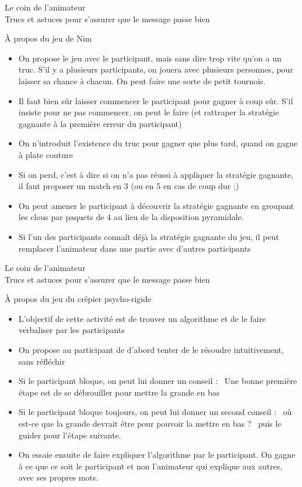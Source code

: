 \documentclass[final,hyperref={pdfpagelabels=false}]{beamer}
\renewcommand*{\large}{\fontsize{\resultlargeX}{\resultlargeY}\selectfont}
\begin{document}
\begin{frame}{Le coin de l'animateur\\[-5pt]
\label{coin::animateur}
  {\large Trucs et astuces pour s'assurer que le message passe bien}}
\begin{block}{À propos du jeu de Nim}
\begin{itemize}
    \item On propose le jeu avec le participant, mais sans dire trop vite qu'on
      a un truc. S'il y a plusieurs participants, on jouera avec plusieurs
      personnes, pour laisser sa chance à chacun. On peut faire une sorte de
      petit tournois.
    \item Il faut bien sûr laisser commencer le participant pour gagner à coup
      sûr. S'il insiste pour ne pas commencer, on peut le faire (et rattraper
      la stratégie gagnante à la première erreur du participant)
    \item On n'introduit l'existence du truc pour gagner que plus tard, quand
      on gagne à plate couture
    \item Si on perd, c'est à dire si on n'a pas réussi à appliquer la
      stratégie gagnante, il faut proposer un match en 3 (ou en 5 en cas de
      coup dur ;)
    \item On peut amener le participant à découvrir la stratégie gagnante en
      groupant les clous par paquets de 4 au lieu de la disposition pyramidale.
    \item Si l'un des participants connaît déjà la stratégie gagnante du jeu,
      il peut remplacer l'animateur dans une partie avec d'autres participants
    \end{itemize}
  \end{block}
\end{frame}

\begin{frame}{Le coin de l'animateur\\[-5pt]
  {\large Trucs et astuces pour s'assurer que le message passe bien}}
  \begin{block}{À propos du jeu du crêpier psycho-rigide}
    \begin{itemize}
    \item L'objectif de cette activité est de trouver un algorithme et de
    le faire verbaliser par les participants
    \item On propose au participant de d'abord tenter de le résoudre
    intuitivement, sans réfléchir
    \item Si le participant bloque, on peut lui donner un conseil : \og~Une
    bonne première étape est de se débrouiller pour mettre la grande en bas~\fg
    \item Si le participant bloque toujours, on peut lui donner un second
    conseil : \og~où est-ce que la grande devrait être pour pouvoir la mettre en
    bas ? ~\fg puis le guider pour l'étape suivante.
    \item On essaie ensuite de faire expliquer l'algorithme par le participant.
    On gagne à ce que ce soit le participant et non l'animateur qui explique aux
    autres, avec ses propres mots.
    \end{itemize}
  \end{block}
\end{frame}
\end{document}
